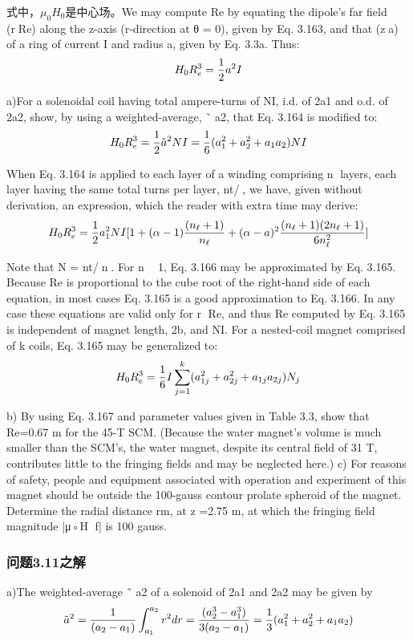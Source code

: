 式中，$\mu_0 H_0$是中心场。We may compute Re by equating the dipole’s far
field (rRe) along the z-axis (r-direction at θ = 0), given by Eq. 3.163, and that
(za) of a ring of current I and radius a, given by Eq. 3.3a. Thus:
$$
H_{0}R_{e}^{3}=\frac{1}{2}a^{2}I\\%
$$

a)For a solenoidal coil having total ampere-turns of NI, i.d. of 2a1 and o.d. of
2a2, show, by using a weighted-average, ˜ a2, that Eq. 3.164 is modified to:
$$
H_{0}R_{e}^{3}=\frac{1}{2}\tilde{a}^{2}NI=\frac{1}{6}(a_{1}^{2}+a_{2}^{2}+a_{1}a_{2})NI\\%
$$

When Eq. 3.164 is applied to each layer of a winding comprising n layers, each
layer having the same total turns per layer, nt/, we have, given without derivation,
an expression, which the reader with extra time may derive:
$$
H_{0}R_{e}^{3}=\frac{1}{2}a_{1}^{2}NI[1+(\alpha-1)\frac{(n_{\ell}+1)}{n_{\ell}}+(\alpha-a)^{2}\frac{(n_{\ell}+1)(2n_{\ell}+1)}{6n_{\ell}^{2}}]\\%
$$

Note that N = nt/n. For n  1, Eq. 3.166 may be approximated by Eq. 3.165.
Because Re is proportional to the cube root of the right-hand side of each equation, in most cases Eq. 3.165 is a good approximation to Eq. 3.166. In any case
these equations are valid only for r Re, and thus Re computed by Eq. 3.165 is
independent of magnet length, 2b, and NI. For a nested-coil magnet comprised
of k coils, Eq. 3.165 may be generalized to:
$$
H_{0}R_{e}^{3}=\frac{1}{6}I\sum_{j=1}^{k}(a_{1j}^{2}+a_{2j}^{2}+a_{1j}a_{2j})N_{j}\\%
$$

b) By using Eq. 3.167 and parameter values given in Table 3.3, show that
Re=0.67 m for the 45-T SCM. (Because the water magnet’s volume is much
smaller than the SCM’s, the water magnet, despite its central field of 31 T,
contributes little to the fringing fields and may be neglected here.)
c) For reasons of safety, people and equipment associated with operation and
experiment of this magnet should be outside the 100-gauss contour prolate
spheroid of the magnet. Determine the radial distance rm, at z =2.75 m, at
which the fringing field magnitude |μ◦H f| is 100 gauss.

\subsubsection{问题3.11之解}
a)The weighted-average ˜ a2 of a solenoid of 2a1 and 2a2 may be given by
$$
\tilde{a}^{2}=\frac{1}{(a_{2}-a_{1})}\int_{a_{1}}^{a_{2}}r^{2}dr=\frac{(a_{2}^{3}-a_{1}^{3})}{3(a_{2}-a_{1})}=\frac{1}{3}(a_{1}^{2}+a_{2}^{2}+a_{1}a_{2})\\%
$$

